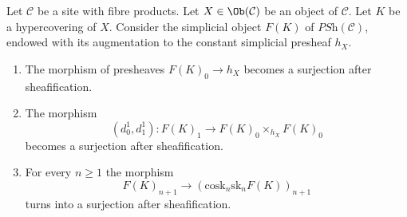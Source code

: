 \begin{lemma}
\label{lemma-hypercovering-F}
Let $\mathcal{C}$ be a site with fibre products.
Let $X \in \Ob(\mathcal{C})$ be an object of $\mathcal{C}$.
Let $K$ be a hypercovering of $X$.
Consider the simplicial object $F(K)$ of $\textit{PSh}(\mathcal{C})$,
endowed with its augmentation to the constant simplicial presheaf $h_X$.
\begin{enumerate}
\item The morphism of presheaves $F(K)_0 \to h_X$ becomes
a surjection after sheafification.
\item The morphism
$$
(d^1_0, d^1_1) :
F(K)_1
\longrightarrow
F(K)_0 \times_{h_X} F(K)_0
$$
becomes a surjection after sheafification.
\item For every $n \geq 1$ the morphism
$$
F(K)_{n + 1} \longrightarrow (\text{cosk}_n \text{sk}_n F(K))_{n + 1}
$$
turns into a surjection after sheafification.
\end{enumerate}
\end{lemma}

